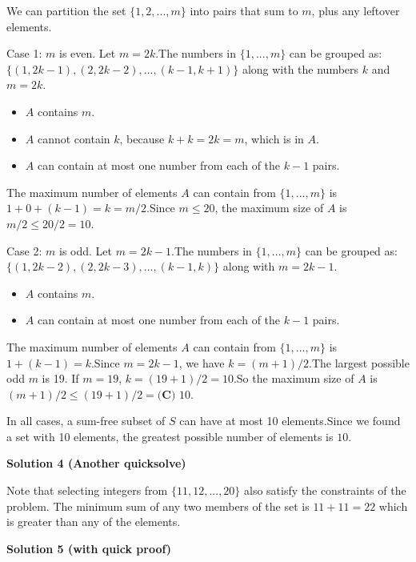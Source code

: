 \begin{enumerate}
 We can partition the set $\{1, 2, ..., m\}$ into pairs that sum to $m$, plus any leftover elements.

 Case 1: $m$ is even. Let $m = 2k$.The numbers in $\{1, ..., m\}$ can be grouped as:$\{ (1, 2k-1), (2, 2k-2), ..., (k-1, k+1) \}$ along with the numbers $k$ and $m=2k$.

 
            \begin{itemize}
        \item $A$ contains $m$.
        \item $A$ cannot contain $k$, because $k+k = 2k = m$, which is in $A$.
        \item $A$ can contain at most one number from each of the $k-1$ pairs.
            \end{itemize}
            The maximum number of elements $A$ can contain from $\{1, ..., m\}$ is $1 + 0 + (k-1) = k = m/2$.Since $m \le 20$, the maximum size of $A$ is $m/2 \le 20/2 = 10$.

 Case 2: $m$ is odd. Let $m = 2k-1$.The numbers in $\{1, ..., m\}$ can be grouped as:$\{ (1, 2k-2), (2, 2k-3), ..., (k-1, k) \}$ along with $m=2k-1$.

 
            \begin{itemize}
        \item $A$ contains $m$.
        \item $A$ can contain at most one number from each of the $k-1$ pairs.
            \end{itemize}
            The maximum number of elements $A$ can contain from $\{1, ..., m\}$ is $1 + (k-1) = k$.Since $m = 2k-1$, we have $k = (m+1)/2$.The largest possible odd $m$ is 19. If $m=19$, $k = (19+1)/2 = 10$.So the maximum size of $A$ is $(m+1)/2 \le (19+1)/2 = \boxed{\textbf{(C) } 10}$.

 In all cases, a sum-free subset of $S$ can have at most 10 elements.Since we found a set with 10 elements, the greatest possible number of elements is $10$.

 



\textbf{Solution 4 (Another quicksolve)}

Note that selecting integers from $\{11, 12, ..., 20\}$ also satisfy the constraints of the problem. The minimum sum of any two members of the set is $11 + 11 = 22$ which is greater than any of the elements.

 



\textbf{Solution 5 (with quick proof)}


\end{enumerate}
